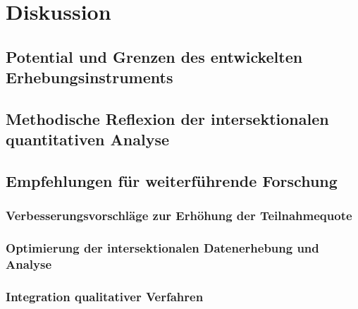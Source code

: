 
\section{Diskussion} \label{sec:diskussion}

\subsection{Potential und Grenzen des entwickelten Erhebungsinstruments}

\subsection{Methodische Reflexion der intersektionalen quantitativen Analyse}

\subsection{Empfehlungen für weiterführende Forschung}

\subsubsection{Verbesserungsvorschläge zur Erhöhung der Teilnahmequote}

\subsubsection{Optimierung der intersektionalen Datenerhebung und Analyse}

\subsubsection{Integration qualitativer Verfahren}
